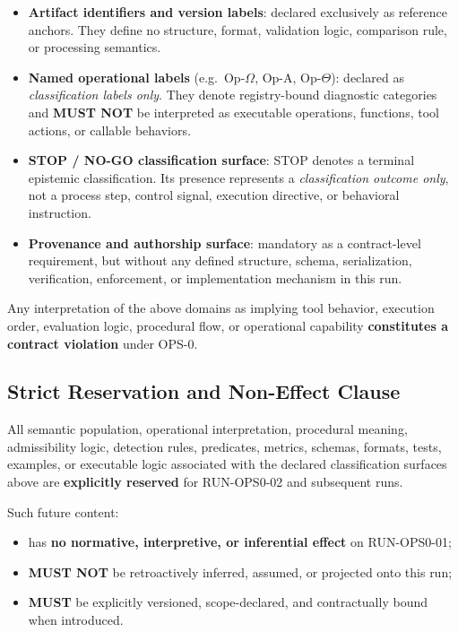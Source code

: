\begin{itemize}
  \item \textbf{Artifact identifiers and version labels}:
        declared exclusively as reference anchors.
        They define no structure, format,
        validation logic, comparison rule,
        or processing semantics.
  \item \textbf{Named operational labels}
        (e.g.\ Op-$\Omega$, Op-A, Op-$\Theta$):
        declared as \emph{classification labels only}.
        They denote registry-bound diagnostic categories
        and \textbf{MUST NOT} be interpreted
        as executable operations, functions,
        tool actions, or callable behaviors.
  \item \textbf{STOP / NO-GO classification surface}:
        STOP denotes a terminal epistemic classification.
        Its presence represents a \emph{classification outcome only},
        not a process step, control signal,
        execution directive, or behavioral instruction.
  \item \textbf{Provenance and authorship surface}:
        mandatory as a contract-level requirement,
        but without any defined structure, schema,
        serialization, verification, enforcement,
        or implementation mechanism in this run.
\end{itemize}

Any interpretation of the above domains
as implying tool behavior, execution order,
evaluation logic, procedural flow,
or operational capability
\textbf{constitutes a contract violation}
under OPS-0.

\subsection{Strict Reservation and Non-Effect Clause}
All semantic population, operational interpretation,
procedural meaning, admissibility logic,
detection rules, predicates, metrics,
schemas, formats, tests, examples,
or executable logic associated with the
declared classification surfaces above
are \textbf{explicitly reserved}
for RUN-OPS0-02 and subsequent runs.

Such future content:
\begin{itemize}
  \item has \textbf{no normative, interpretive,
        or inferential effect} on RUN-OPS0-01;
  \item \textbf{MUST NOT} be retroactively inferred,
        assumed, or projected onto this run;
  \item \textbf{MUST} be explicitly versioned,
        scope-declared, and contractually bound
        when introduced.
\end{itemize}
